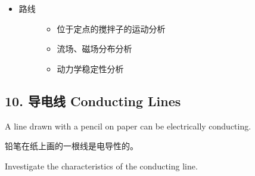 \documentclass[a4paper,10pt,english]{sphinxmanual}
\begin{document}
\begin{itemize}
\begin{description}
\begin{itemize}
\begin{enumerate}
\begin{enumerate}
\end{enumerate}

\end{enumerate}

\end{itemize}

\end{description}

\item {} \begin{description}
\item[{路线}] \leavevmode\begin{itemize}
\item {} 
位于定点的搅拌子的运动分析

\item {} 
流场、磁场分布分析

\item {} 
动力学稳定性分析

\end{itemize}

\end{description}

\end{itemize}


\subsection{10. 导电线 Conducting Lines}
\label{\detokenize{7. Appendix:conducting-lines}}
A line drawn with a pencil on paper can be electrically conducting.

铅笔在纸上画的一根线是电导性的。

Investigate the characteristics of the conducting line.
\end{document}
